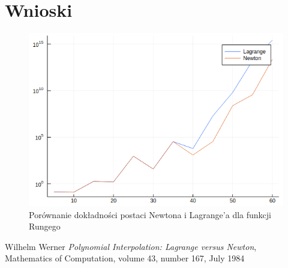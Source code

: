 \documentclass[paper=a4, fontsize=11pt]{scrartcl} %
\numberwithin{equation}{section} %
\numberwithin{figure}{section} %
\numberwithin{table}{section} %
\begin{document}
\section{Wnioski}

\begin{figure}[h!]
  \includegraphics[width=\linewidth]{lagnew.png}
  \caption{Porównanie dokładności postaci Newtona i Lagrange'a dla funkcji Rungego}
  \label{lagnew}
\end{figure} 


\begin{thebibliography}{9}

  Wilhelm Werner
  \textit{Polynomial Interpolation: Lagrange versus Newton}, \\
  Mathematics of Computation, volume 43, number 167, July 1984
\end{thebibliography}
\end{document}
